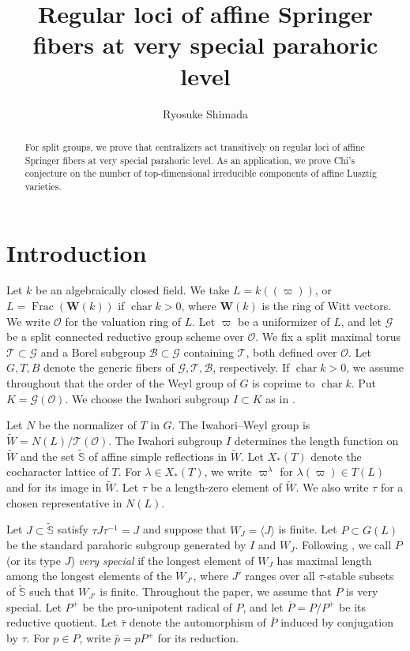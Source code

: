 \documentclass[12pt]{article}
\newcommand\cB{\mathcal B}
\newcommand\cO{\mathcal O}
\newcommand\cG{\mathcal G}
\newcommand\cT{\mathcal T}
\newcommand\tW{\tilde W}
\newcommand\tS{\tilde{\mathbb S}}
\newcommand\vp{\varpi}
\theoremstyle{definition}
\begin{document}
\title{Regular loci of affine Springer fibers at very special parahoric level}
\author{Ryosuke Shimada}
\date{}
\maketitle
\begin{abstract}
For split groups, we prove that centralizers act transitively on regular loci of affine Springer fibers at very special parahoric level.
As an application, we prove Chi's conjecture on the number of top-dimensional irreducible components of affine Lusztig varieties.
\end{abstract}

\section{Introduction}
\label{introduction}

Let $k$ be an algebraically closed field.
We take $L=k((\vp))$, or $L=\operatorname{Frac}(\mathbf{W}(k))$ if $\operatorname{char}k>0$, where $\mathbf{W}(k)$ is the ring of Witt vectors.
We write $\cO$ for the valuation ring of $L$.
Let $\vp$ be a uniformizer of $L$, and let $\cG$ be a split connected reductive group scheme over $\cO$.
We fix a split maximal torus $\cT\subset\cG$ and a Borel subgroup $\cB\subset\cG$ containing $\cT$, both defined over $\cO$.
Let $G,T,B$ denote the generic fibers of $\cG,\cT,\cB$, respectively.
If $\operatorname{char}k>0$, we assume throughout that the order of the Weyl group of $G$ is coprime to $\operatorname{char}k$.
Put $K=\cG(\cO)$.
We choose the Iwahori subgroup $I\subset K$ as in \cite[\S1.1]{He25}.

Let $N$ be the normalizer of $T$ in $G$. The Iwahori--Weyl group is $\tW=N(L)/\cT(\cO)$.
The Iwahori subgroup $I$ determines the length function on $\tW$ and the set $\tS$ of affine simple reflections in $\tW$.
Let $X_*(T)$ denote the cocharacter lattice of $T$.
For $\lambda\in X_*(T)$, we write $\vp^\lambda$ for $\lambda(\vp)\in T(L)$ and for its image in $\tW$.
Let $\tau$ be a length-zero element of $\tW$. We also write $\tau$ for a chosen representative in $N(L)$.

Let $J\subset\tS$ satisfy $\tau J\tau^{-1}=J$ and suppose that $W_J=\langle J\rangle$ is finite.
Let $P\subset G(L)$ be the standard parahoric subgroup generated by $I$ and $W_J$.
Following \cite[\S3.1]{He25}, we call $P$ (or its type $J$) {\it very special} if the longest element of $W_J$ has maximal length among the longest elements of the $W_{J'}$, where $J'$ ranges over all $\tau$-stable subsets of $\tS$ such that $W_{J'}$ is finite.
Throughout the paper, we assume that $P$ is very special.
Let $P^+$ be the pro-unipotent radical of $P$, and let $\overline P=P/P^+$ be its reductive quotient.
Let $\bar\tau$ denote the automorphism of $\overline P$ induced by conjugation by $\tau$.
For $p\in P$, write $\bar p=pP^+$ for its reduction.
\end{document}
